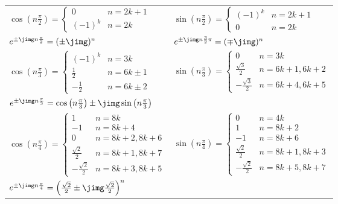 \begin{center}
\begin{tabular}{ll}
    $\cos\left(n\frac{\pi}{2}\right) = \begin{cases} 0 & n = 2k+1 \\ (-1)^k & n = 2k \end{cases}$ & 
    $\sin\left(n\frac{\pi}{2}\right) = \begin{cases} (-1)^k & n = 2k+1 \\ 0 & n = 2k \end{cases}$ \\
    \noalign{\vspace{0.15cm}}
    $e^{\pm\jimg n\frac{\pi}{2}} = (\pm\jimg)^n$ & 
    $e^{\pm\jimg n\frac{3}{2}\pi} = (\mp\jimg)^n$ \\
    \noalign{\vspace{0.15cm}}
    $\cos\left(n\frac{\pi}{3}\right) = \begin{cases} (-1)^k & n = 3k \\ \frac{1}{2} & n = 6k \pm 1 \\ -\frac{1}{2} & n = 6k \pm 2 \end{cases}$ &
    $\sin\left(n\frac{\pi}{3}\right) = \begin{cases} 0 & n = 3k \\ \frac{\sqrt{3}}{2} & n = 6k+1, 6k+2 \\ -\frac{\sqrt{3}}{2} & n = 6k+4, 6k+5 \end{cases}$ \\
    \noalign{\vspace{0.15cm}}
    $e^{\pm\jimg n\frac{\pi}{3}} = \cos\left(n\frac{\pi}{3}\right) \pm \jimg \sin\left(n\frac{\pi}{3}\right)$ & \\
    \noalign{\vspace{0.15cm}}
    $\cos\left(n\frac{\pi}{4}\right) = \begin{cases} 1 & n = 8k \\ -1 & n = 8k+4 \\ 0 & n = 8k+2, 8k+6 \\ \frac{\sqrt{2}}{2} & n = 8k+1, 8k+7 \\ -\frac{\sqrt{2}}{2} & n = 8k+3, 8k+5 \end{cases}$ &
    $\sin\left(n\frac{\pi}{4}\right) = \begin{cases} 0 & n = 4k \\ 1 & n = 8k+2 \\ -1 & n = 8k+6 \\ \frac{\sqrt{2}}{2} & n = 8k+1, 8k+3 \\ -\frac{\sqrt{2}}{2} & n = 8k+5, 8k+7 \end{cases}$ \\
    \noalign{\vspace{0.15cm}}
    $e^{\pm\jimg n\frac{\pi}{4}} = \left(\frac{\sqrt{2}}{2} \pm \jimg\frac{\sqrt{2}}{2}\right)^n$ & 
\end{tabular}
\end{center}

